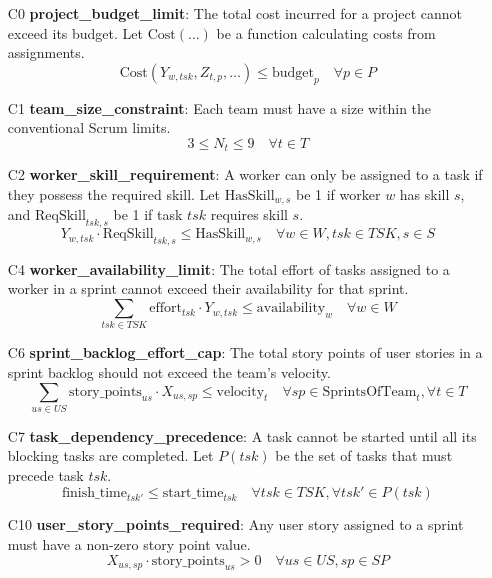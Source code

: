 \documentclass[11pt]{article}
\begin{document}
\begin{itemize}
    \item[C0] \textbf{project\_budget\_limit}: The total cost incurred for a project cannot exceed its budget. Let $\text{Cost}(...)$ be a function calculating costs from assignments.
    $$ \text{Cost}(Y_{w,tsk}, Z_{t,p}, \dots) \le \text{budget}_p \quad \forall p \in P $$
    \item[C1] \textbf{team\_size\_constraint}: Each team must have a size within the conventional Scrum limits.
    $$ 3 \le N_t \le 9 \quad \forall t \in T $$
    \item[C2] \textbf{worker\_skill\_requirement}: A worker can only be assigned to a task if they possess the required skill. Let $\text{HasSkill}_{w,s}$ be 1 if worker $w$ has skill $s$, and $\text{ReqSkill}_{tsk,s}$ be 1 if task $tsk$ requires skill $s$.
    $$ Y_{w,tsk} \cdot \text{ReqSkill}_{tsk,s} \le \text{HasSkill}_{w,s} \quad \forall w \in W, tsk \in TSK, s \in S $$
    \item[C4] \textbf{worker\_availability\_limit}: The total effort of tasks assigned to a worker in a sprint cannot exceed their availability for that sprint.
    $$ \sum_{tsk \in TSK} \text{effort}_{tsk} \cdot Y_{w,tsk} \le \text{availability}_{w} \quad \forall w \in W $$
    \item[C6] \textbf{sprint\_backlog\_effort\_cap}: The total story points of user stories in a sprint backlog should not exceed the team's velocity.
    $$ \sum_{us \in US} \text{story\_points}_{us} \cdot X_{us,sp} \le \text{velocity}_t \quad \forall sp \in \text{SprintsOfTeam}_t, \forall t \in T $$
    \item[C7] \textbf{task\_dependency\_precedence}: A task cannot be started until all its blocking tasks are completed. Let $P(tsk)$ be the set of tasks that must precede task $tsk$.
    $$ \text{finish\_time}_{tsk'} \le \text{start\_time}_{tsk} \quad \forall tsk \in TSK, \forall tsk' \in P(tsk) $$
    \item[C10] \textbf{user\_story\_points\_required}: Any user story assigned to a sprint must have a non-zero story point value.
    $$ X_{us,sp} \cdot \text{story\_points}_{us} > 0 \quad \forall us \in US, sp \in SP $$
\end{itemize}
\end{document}
